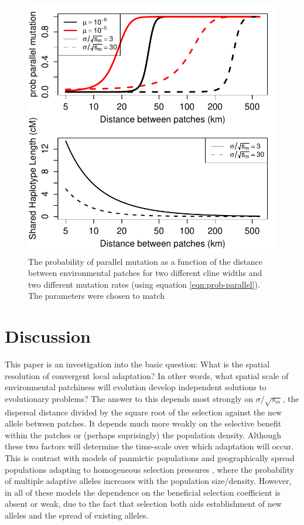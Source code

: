 \documentclass{article}
\begin{document}
\begin{figure}[ht]
  \begin{center}
    \includegraphics{Lava_flow_mice_prob_parallel}
  \end{center}
  \caption{
The probability of parallel mutation as a function of the distance
between environmental patches for two different cline widths
and two different mutation rates (using equation \eqref{eqn:prob-parallel}). 
The parameters were chosen to match  
  \label{fig:mice_prob_parallel}
  }
\end{figure}


\section{Discussion} 
\label{ss:discussion}

This paper is an investigation into the basic question: 
What is the spatial resolution of convergent local adaptation?
In other words, what spatial scale of environmental patchiness will evolution develop independent solutions to evolutionary problems?
The answer to this depends most strongly on $\sigma/\sqrt{s_m}$, 
the dispersal distance divided by the square root of the selection
against the new allele between patches. It depends much more weakly on the
selective benefit within the patches or (perhaps suprisingly) the
population density. Although these two factors will determine the
time-scale over which adaptation will occur. This is contrast with models of panmictic populations
\citep{softsweepsI} and geographically spread populations adapting to homogeneous
selection pressures \citep{RalphCoop}, where the probability of
multiple adaptive alleles increases with the population
size/density. However, in all of these models the dependence on the beneficial selection
coefficient is absent or weak, due to the fact that selection both
aids establishment of new alleles and the spread of existing
alleles. 
\end{document}
